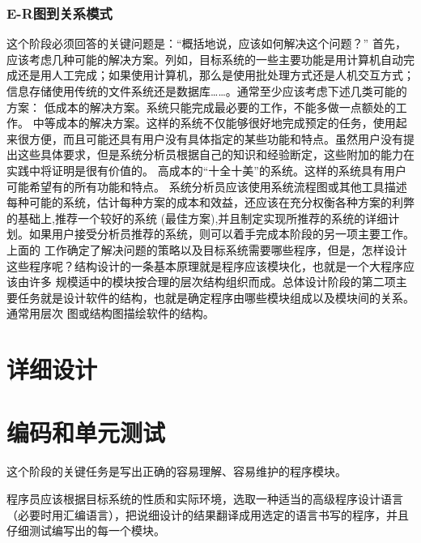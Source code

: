            \subsubsection{E-R图到关系模式}
        
    这个阶段必须回答的关键问题是：“概括地说，应该如何解决这个问题？”
    首先，应该考虑几种可能的解决方案。列如，目标系统的一些主要功能是用计算机自动完成还是用人工完成；如果使用计算机，那么是使用批处理方式还是人机交互方式；信息存储使用传统的文件系统还是数据库……。通常至少应该考虑下述几类可能的方案：
    低成本的解决方案。系统只能完成最必要的工作，不能多做一点额处的工作。
    中等成本的解决方案。这样的系统不仅能够很好地完成预定的任务，使用起来很方便，而且可能还具有用户没有具体指定的某些功能和特点。虽然用户没有提出这些具体要求，但是系统分析员根据自己的知识和经验断定，这些附加的能力在实践中将证明是很有价值的。
    高成本的“十全十美”的系统。这样的系统具有用户可能希望有的所有功能和特点。
    系统分析员应该使用系统流程图或其他工具描述每种可能的系统，估计每种方案的成本和效益，还应该在充分权衡各种方案的利弊的基础上,推荐一个较好的系统 (最佳方案),并且制定实现所推荐的系统的详细计划。如果用户接受分析员推荐的系统，则可以着手完成本阶段的另一项主要工作。
    上面的 工作确定了解决问题的策略以及目标系统需要哪些程序，但是，怎样设计这些程序呢？结构设计的一条基本原理就是程序应该模块化，也就是一个大程序应该由许多 规模适中的模块按合理的层次结构组织而成。总体设计阶段的第二项主要任务就是设计软件的结构，也就是确定程序由哪些模块组成以及模块间的关系。通常用层次 图或结构图描绘软件的结构。


    \section{详细设计}
      
   
    \section{编码和单元测试}
  这个阶段的关键任务是写出正确的容易理解、容易维护的程序模块。\par
  程序员应该根据目标系统的性质和实际环境，选取一种适当的高级程序设计语言（必要时用汇编语言），把说细设计的结果翻译成用选定的语言书写的程序，并且仔细测试编写出的每一个模块。
